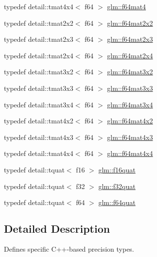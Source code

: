 \begin{DoxyCompactItemize}
\item 
typedef detail\+::tmat4x4$<$ f64 $>$ \hyperlink{group__gtc__type__precision_ga20a9c8bd28f6eb7ad10574e5f9068145}{glm\+::f64mat4}
\item 
typedef detail\+::tmat2x2$<$ f64 $>$ \hyperlink{group__gtc__type__precision_ga5d1ccf7df0dedda7f0c0dd791abf3fd0}{glm\+::f64mat2x2}
\item 
typedef detail\+::tmat2x3$<$ f64 $>$ \hyperlink{group__gtc__type__precision_gac2bd82a88b290054fc10cfdba4a62863}{glm\+::f64mat2x3}
\item 
typedef detail\+::tmat2x4$<$ f64 $>$ \hyperlink{group__gtc__type__precision_ga33d98da07dc45f5bdd5f1cbb93ad4934}{glm\+::f64mat2x4}
\item 
typedef detail\+::tmat3x2$<$ f64 $>$ \hyperlink{group__gtc__type__precision_gaa3edc3353425c0b14b91ebde718d5bd5}{glm\+::f64mat3x2}
\item 
typedef detail\+::tmat3x3$<$ f64 $>$ \hyperlink{group__gtc__type__precision_gac0fe6a1fb044122b28859feede132b75}{glm\+::f64mat3x3}
\item 
typedef detail\+::tmat3x4$<$ f64 $>$ \hyperlink{group__gtc__type__precision_ga41bb7ff3c269ffae270d33acb3fcfae3}{glm\+::f64mat3x4}
\item 
typedef detail\+::tmat4x2$<$ f64 $>$ \hyperlink{group__gtc__type__precision_ga1097a920f29777c4220939e323377012}{glm\+::f64mat4x2}
\item 
typedef detail\+::tmat4x3$<$ f64 $>$ \hyperlink{group__gtc__type__precision_gaa24e152ef6e17be752c350e495c879de}{glm\+::f64mat4x3}
\item 
typedef detail\+::tmat4x4$<$ f64 $>$ \hyperlink{group__gtc__type__precision_ga8f54fb7f48ddf13b3dea075ae89baa78}{glm\+::f64mat4x4}
\item 
typedef detail\+::tquat$<$ f16 $>$ \hyperlink{group__gtc__type__precision_gaf88b8ffe0545265127f072a73725337f}{glm\+::f16quat}
\item 
typedef detail\+::tquat$<$ f32 $>$ \hyperlink{group__gtc__type__precision_ga7edc623b0da433e074936e732600766f}{glm\+::f32quat}
\item 
typedef detail\+::tquat$<$ f64 $>$ \hyperlink{group__gtc__type__precision_ga61f850d473c8569fcc124bdeed386f57}{glm\+::f64quat}
\end{DoxyCompactItemize}


\subsection{Detailed Description}
Defines specific C++-\/based precision types. 

